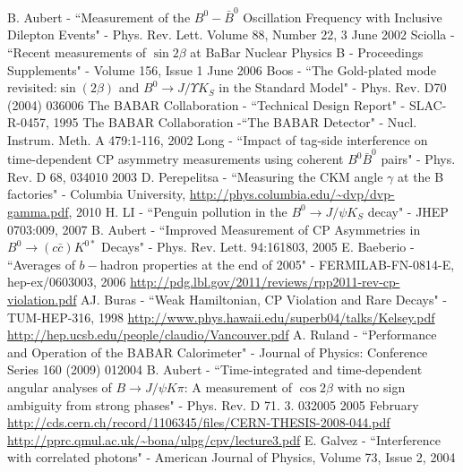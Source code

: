 \documentclass[floatfix,aps,prd,amsmath,amssymb]{revtex4}
\begin{document}
\begin{thebibliography}{10}
B. Aubert - ``Measurement of the $B^{0}-\bar{B}^{0}$ Oscillation Frequency with Inclusive Dilepton Events" - Phys. Rev. Lett. Volume 88, Number 22, 3 June 2002
Sciolla - ``Recent measurements of $\sin2\beta$ at BaBar Nuclear Physics B - Proceedings Supplements" - Volume 156, Issue 1 June 2006
Boos - ``The Gold-plated mode revisited:$\sin(2\beta)$ and $B^{0}\rightarrow J/\Upsilon K_{S}$ in the Standard Model" - Phys. Rev. D70 (2004) 036006
The BABAR Collaboration - ``Technical Design Report" - SLAC-R-0457, 1995
The BABAR Collaboration -``The BABAR Detector" - Nucl. Instrum. Meth. A 479:1-116, 2002
Long - ``Impact of tag-side interference on time-dependent CP asymmetry measurements using coherent $B^{0} \bar{B}^0$ pairs" - Phys. Rev. D 68, 034010 2003
D. Perepelitsa - ``Measuring the CKM angle $\gamma$ at the B factories" - Columbia University, \url{http://phys.columbia.edu/~dvp/dvp-gamma.pdf}, 2010
H. LI - ``Penguin pollution in the $B^0 \rightarrow J/\psi K_{S}$ decay" - JHEP 0703:009, 2007
B. Aubert - ``Improved Measurement of CP Asymmetries in $B^{0} \rightarrow (c \bar{c})K^{0*}$ Decays" - Phys. Rev. Lett. 94:161803, 2005
E. Baeberio - ``Averages of $b-$hadron properties at the end of 2005" - FERMILAB-FN-0814-E, hep-ex/0603003, 2006
\url{http://pdg.lbl.gov/2011/reviews/rpp2011-rev-cp-violation.pdf}
AJ. Buras - ``Weak Hamiltonian, CP Violation and Rare Decays" - TUM-HEP-316, 1998
\url{http://www.phys.hawaii.edu/superb04/talks/Kelsey.pdf}
\url{http://hep.ucsb.edu/people/claudio/Vancouver.pdf}
A. Ruland - ``Performance and Operation of the BABAR Calorimeter" - Journal of Physics: Conference Series 160 (2009) 012004
B. Aubert - ``Time-integrated and time-dependent angular analyses of $B\rightarrow J/\psi K\pi$: A measurement of $\cos2\beta$ with no sign ambiguity from strong phases" - Phys. Rev. D 71. 3. 032005 2005 February
\url{http://cds.cern.ch/record/1106345/files/CERN-THESIS-2008-044.pdf}
\url{http://pprc.qmul.ac.uk/~bona/ulpg/cpv/lecture3.pdf}
E. Galvez - ``Interference with correlated photons" - American Journal of Physics, Volume 73, Issue 2, 2004


\end{thebibliography}
\end{document}
